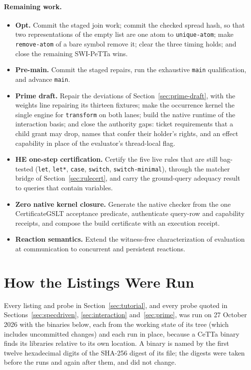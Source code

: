 \documentclass[11pt]{article}
\newcommand{\code}[1]{\texttt{#1}}
\newcommand{\PeTTa}{\textup{PeTTa}}
\newcommand{\HE}{\textup{HE}}
\newcommand{\CeTTa}{\textup{CeTTa}}
\begin{document}
\paragraph{Remaining work.}
\begin{itemize}
\item \textbf{Opt.} Commit the staged join work; commit the checked spread
  hash, so that two representations of the empty list are one atom to
  \code{unique-atom}; make \code{remove-atom} of a bare symbol remove it;
  clear the three timing holds; and close the remaining SWI-\PeTTa{} wins.
\item \textbf{Pre-main.} Commit the staged repairs, run the exhaustive
  \code{main} qualification, and advance \code{main}.
\item \textbf{Prime draft.} Repair the deviations of
  Section~\ref{sec:prime-draft}, with the weights line repairing its thirteen
  fixtures; make the occurrence kernel the single engine for \code{transform}
  on both lanes; build the native runtime of the interaction basis; and close
  the authority gaps: ticket requirements that a child grant may drop, names
  that confer their holder's rights, and an effect capability in place of the
  evaluator's thread-local flag.
\item \textbf{\HE{} one-step certification.} Certify the five live rules that
  are still bag-tested (\code{let}, \code{let*}, \code{case}, \code{switch},
  \code{switch-minimal}), through the matcher bridge of
  Section~\ref{sec:rulecert}, and carry the ground-query adequacy result to
  queries that contain variables.
\item \textbf{Zero native kernel closure.} Generate the native checker from the
  one CertificateGSLT acceptance predicate, authenticate query-row and
  capability receipts, and compose the build certificate with an execution
  receipt.
\item \textbf{Reaction semantics.} Extend the witness-free characterization of
  evaluation at communication to concurrent and persistent reactions.
\end{itemize}


\appendix

\section{How the Listings Were Run}
\label{app:runs}

Every listing and probe in Section~\ref{sec:tutorial}, and every probe quoted
in Sections~\ref{sec:specdriven}, \ref{sec:interaction} and~\ref{sec:prime},
was run on 27 October 2026 with the binaries below, each from the working
state of its tree (which includes uncommitted changes) and each run in place,
because a \CeTTa{} binary finds its libraries relative to its own location.
A binary is named by the first twelve hexadecimal digits of the SHA-256 digest
of its file; the digests were taken before the runs and again after them, and
did not change.
\end{document}
